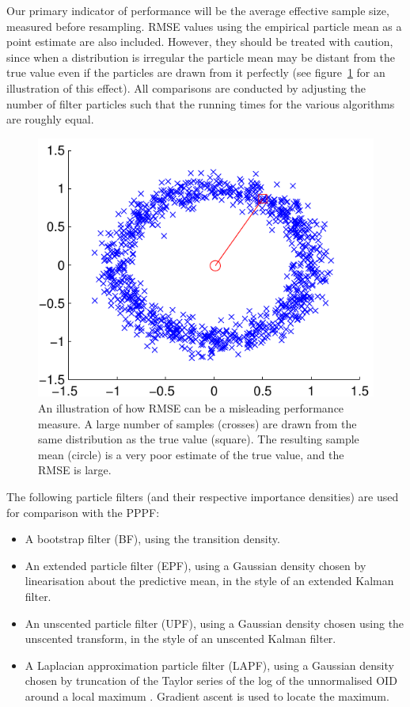 \documentclass{article}
\begin{document}
Our primary indicator of performance will be the average effective sample size, measured before resampling. RMSE values using the empirical particle mean as a point estimate are also included. However, they should be treated with caution, since when a distribution is irregular the particle mean may be distant from the true value even if the particles are drawn from it perfectly (see figure~\ref{fig:rmse_fail} for an illustration of this effect). All comparisons are conducted by adjusting the number of filter particles such that the running times for the various algorithms are roughly equal.
%
\begin{figure}
\centering
\includegraphics[width=0.7\columnwidth]{rmse_fail.pdf}
\caption{An illustration of how RMSE can be a misleading performance measure. A large number of samples (crosses) are drawn from the same distribution as the true value (square). The resulting sample mean (circle) is a very poor estimate of the true value, and the RMSE is large.}
\label{fig:rmse_fail}
\end{figure}

The following particle filters (and their respective importance densities) are used for comparison with the PPPF:
\begin{itemize}
        \item A bootstrap filter (BF), using the transition density.
        \item An extended particle filter (EPF), using a Gaussian density chosen by linearisation about the predictive mean, in the style of an extended Kalman filter.
        \item An unscented particle filter (UPF), using a Gaussian density chosen using the unscented transform, in the style of an unscented Kalman filter.
        \item A Laplacian approximation particle filter (LAPF), using a Gaussian density chosen by truncation of the Taylor series of the log of the unnormalised OID around a local maximum \citep{Doucet2000a}. Gradient ascent is used to locate the maximum.
\end{itemize}
\end{document}
